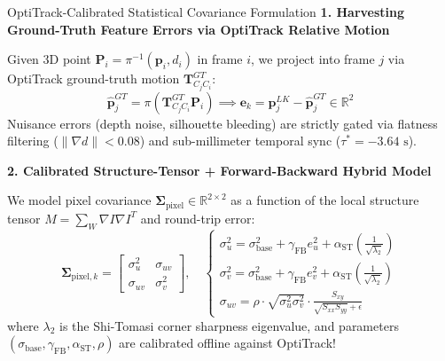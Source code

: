 \documentclass[aspectratio=169, 10pt]{beamer}
\begin{document}
\begin{frame}{OptiTrack-Calibrated Statistical Covariance Formulation}
  {\normalsize \textbf{\textcolor{NavyBlue}{1. Harvesting Ground-Truth Feature Errors via OptiTrack Relative Motion}}}
  \vspace{0.1cm}

  Given 3D point $\mathbf{P}_i = \pi^{-1}(\mathbf{p}_i, d_i)$ in frame $i$, we project into frame $j$ via OptiTrack ground-truth motion $\mathbf{T}_{C_j C_i}^{GT}$:
  \begin{equation}
    \hat{\mathbf{p}}_j^{GT} = \pi\left( \mathbf{T}_{C_j C_i}^{GT} \mathbf{P}_i \right) \implies \mathbf{e}_k = \mathbf{p}_j^{LK} - \hat{\mathbf{p}}_j^{GT} \in \mathbb{R}^2
  \end{equation}
  Nuisance errors (depth noise, silhouette bleeding) are strictly gated via flatness filtering ($\|\nabla d\| < 0.08$) and sub-millimeter temporal sync ($\tau^* = -3.64\text{ s}$).

  \vspace{0.2cm}
  {\normalsize \textbf{\textcolor{NavyBlue}{2. Calibrated Structure-Tensor + Forward-Backward Hybrid Model}}}
  \vspace{0.1cm}

  We model pixel covariance $\mathbf{\Sigma}_{\text{pixel}} \in \mathbb{R}^{2 \times 2}$ as a function of the local structure tensor $M = \sum_W \nabla I \nabla I^T$ and round-trip error:
  \begin{equation}
    \mathbf{\Sigma}_{\text{pixel}, k} = \begin{bmatrix} \sigma_u^2 & \sigma_{uv} \\ \sigma_{uv} & \sigma_v^2 \end{bmatrix}, \quad
    \begin{cases}
      \sigma_u^2 = \sigma_{\text{base}}^2 + \gamma_{\text{FB}} e_u^2 + \alpha_{\text{ST}} \left( \frac{1}{\sqrt{\lambda_2}} \right) \\[4pt]
      \sigma_v^2 = \sigma_{\text{base}}^2 + \gamma_{\text{FB}} e_v^2 + \alpha_{\text{ST}} \left( \frac{1}{\sqrt{\lambda_2}} \right) \\[4pt]
      \sigma_{uv} = \rho \cdot \sqrt{\sigma_u^2 \sigma_v^2} \cdot \frac{S_{xy}}{\sqrt{S_{xx} S_{yy}} + \epsilon}
    \end{cases}
  \end{equation}
  where $\lambda_2$ is the Shi-Tomasi corner sharpness eigenvalue, and parameters $(\sigma_{\text{base}}, \gamma_{\text{FB}}, \alpha_{\text{ST}}, \rho)$ are calibrated offline against OptiTrack!
\end{frame}
\end{document}
